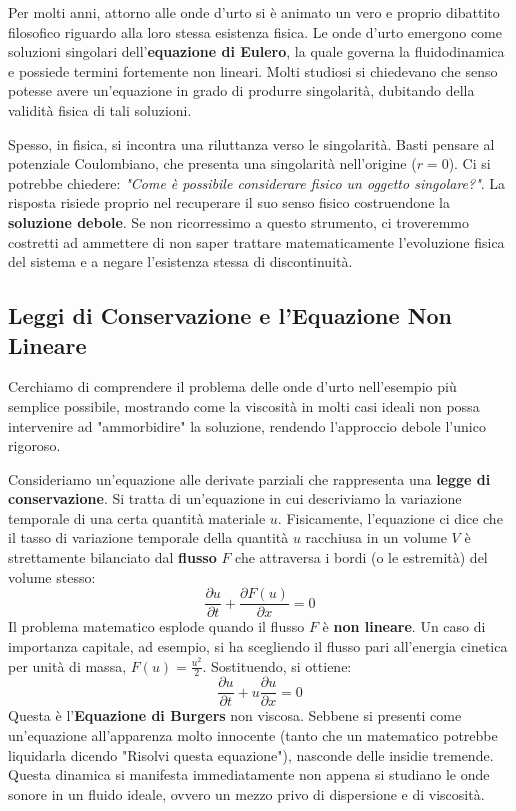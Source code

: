 Per molti anni, attorno alle onde d'urto si è animato un vero e proprio dibattito filosofico riguardo alla loro stessa esistenza fisica. Le onde d'urto emergono come soluzioni singolari dell'\textbf{equazione di Eulero}, la quale governa la fluidodinamica e possiede termini fortemente non lineari. Molti studiosi si chiedevano che senso potesse avere un'equazione in grado di produrre singolarità, dubitando della validità fisica di tali soluzioni.

Spesso, in fisica, si incontra una riluttanza verso le singolarità. Basti pensare al potenziale Coulombiano, che presenta una singolarità nell'origine ($r=0$). Ci si potrebbe chiedere: \textit{"Come è possibile considerare fisico un oggetto singolare?"}. La risposta risiede proprio nel recuperare il suo senso fisico costruendone la \textbf{soluzione debole}. Se non ricorressimo a questo strumento, ci troveremmo costretti ad ammettere di non saper trattare matematicamente l'evoluzione fisica del sistema e a negare l'esistenza stessa di discontinuità.

\subsection{Leggi di Conservazione e l'Equazione Non Lineare}
Cerchiamo di comprendere il problema delle onde d'urto nell'esempio più semplice possibile, mostrando come la viscosità in molti casi ideali non possa intervenire ad "ammorbidire" la soluzione, rendendo l'approccio debole l'unico rigoroso.

Consideriamo un'equazione alle derivate parziali che rappresenta una \textbf{legge di conservazione}. Si tratta di un'equazione in cui descriviamo la variazione temporale di una certa quantità materiale $u$. Fisicamente, l'equazione ci dice che il tasso di variazione temporale della quantità $u$ racchiusa in un volume $V$ è strettamente bilanciato dal \textbf{flusso} $F$ che attraversa i bordi (o le estremità) del volume stesso:
\begin{equation}
\frac{\partial u}{\partial t} + \frac{\partial F(u)}{\partial x} = 0
\end{equation}
Il problema matematico esplode quando il flusso $F$ è \textbf{non lineare}. Un caso di importanza capitale, ad esempio, si ha scegliendo il flusso pari all'energia cinetica per unità di massa, $F(u) = \frac{u^2}{2}$. Sostituendo, si ottiene:
\begin{equation}
\frac{\partial u}{\partial t} + u \frac{\partial u}{\partial x} = 0
\end{equation}
Questa è l'\textbf{Equazione di Burgers} non viscosa. Sebbene si presenti come un'equazione all'apparenza molto innocente (tanto che un matematico potrebbe liquidarla dicendo "Risolvi questa equazione"), nasconde delle insidie tremende. Questa dinamica si manifesta immediatamente non appena si studiano le onde sonore in un fluido ideale, ovvero un mezzo privo di dispersione e di viscosità.

